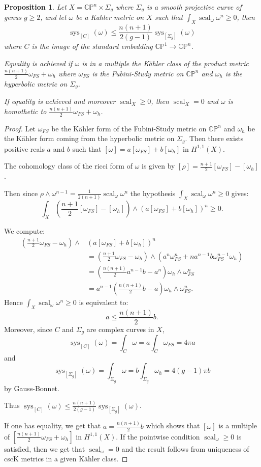 \documentclass{amsart}
\newtheorem{proposition}[theorem]{Proposition}
\numberwithin{equation}{section}
\theoremstyle{definition}
\DeclareMathOperator{\scal}{scal}
\DeclareMathOperator{\sys}{sys}
\begin{document}
\begin{proposition}
Let $X=\mathbb{CP}^n\times \Sigma_g$ where $\Sigma_g$ is a smooth projective curve of genus $g\geq 2$, and let $\omega$ be a Kahler metric on $X$ such that $\int_X\scal_\omega\omega^n\geq 0$, then \[\sys_{[C]}(\omega)\leq \frac{n(n+1)}{2(g-1)}\sys_{[\Sigma_g]}(\omega)\] where $C$ is the image of the standard embedding $\mathbb{CP}^1\to\mathbb{CP}^n$.

Equality is achieved if $\omega$ is in a multiple the K\"ahler class of the product metric $\frac{n(n+1)}{2}\omega_{FS}+\omega_h$ where $\omega_{FS}$ is the Fubini-Study metric on $\mathbb{CP}^n$ and $\omega_h$ is the hyperbolic metric on $\Sigma_g$.

If equality is achieved and moreover $\scal_X\geq 0$, then $\scal_X=0$ and $\omega$ is homothetic to $\frac{n(n+1)}{2}\omega_{FS}+\omega_h$.
\end{proposition}
\begin{proof}
Let $\omega_{FS}$ be the K\"ahler form of the Fubini-Study metric on $\mathbb{CP^n}$ and $\omega_h$ be the K\"ahler form coming from the hyperbolic metric on $\Sigma_g$.
Then there exists positive reals $a$ and $b$ such that $[\omega]=a[\omega_{FS}]+b[\omega_h]$ in $H^{1,1}(X)$.

The cohomology class of the ricci form of $\omega$ is given by
$[\rho]=\frac{n+1}{2}[\omega_{FS}]-[\omega_h]$.

Then since $\rho\wedge\omega^{n-1}=\frac{1}{2(n+1)}\scal_\omega\omega^n$ the hypothesis $\int_X\scal_\omega\omega^n\geq 0$ gives:
\[\int_X \left (\frac{n+1}{2}[\omega_{FS}]-[\omega_h]\right)\wedge \left(a[\omega_{FS}]+b[\omega_h]\right)^n\geq 0.\]

We compute:
\begin{align*}
\left (\frac{n+1}{2}\omega_{FS}-\omega_h\right)\wedge & \left(a[\omega_{FS}]+b[\omega_h]\right)^n\\
&=\left(\frac{n+1}{2}\omega_{FS}-\omega_h\right)\wedge(a^n\omega_{FS}^n+na^{n-1}b\omega_{FS}^{n-1}\omega_h)\\
&=\left(\frac{n(n+1)}{2}a^{n-1}b-a^n\right)\omega_h\wedge\omega_{FS}^n\\
&=a^{n-1}\left(\frac{n(n+1)}{2}b-a\right)\omega_h\wedge\omega_{FS}^n.
\end{align*}
Hence $\int_X\scal_{\omega}\omega^n\geq 0$ is equivalent to:
\[a\leq\frac{n(n+1)}{2}b.\]
Moreover, since $C$ and $\Sigma_g$ are complex curves in $X$, \[\sys_{[C]}(\omega)=\int_C\omega=a\int_C\omega_{FS}=4\pi a\]
and
\[\sys_{[\Sigma_g]}(\omega)=\int_{\Sigma_g}\omega=b\int_{\Sigma_g}\omega_{h}=4(g-1)\pi b\] by Gauss-Bonnet.

Thus $\sys_{[C]}(\omega)\leq\frac{n(n+1)}{2(g-1)}\sys_{[\Sigma_g]}(\omega)$.

If one has equality, we get that $a=\frac{n(n+1)}{2}b$ which shows that $[\omega]$ is a multiple of $[\frac{n(n+1)}{2}\omega_{FS}+\omega_h]$ in $H^{1,1}(X)$. If the pointwise condition $\scal_\omega\geq 0$ is satisfied, then we get that $\scal_\omega=0$ and the result follows from uniqueness of cscK metrics in a given K\"ahler class.
\end{proof}
\end{document}
